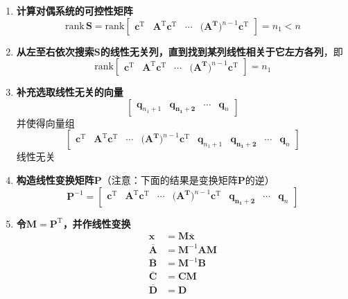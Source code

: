 \example[系统的可观性分解]
\vspace*{-1em}
\begin{enumerate}[\textbf{步骤} 1 ]
	\item \textbf{计算对偶系统的可控性矩阵}
	\begin{equation}
		\text{rank}\, \bm{S} = \text{rank}
		\begin{bmatrix}
			\bm{c}^{\text{T}} & \bm{A}^{\text{T}}\bm{c}^{\text{T}} & \cdots & \big(\bm{A^{\text{T}}}\big)^{n-1}\bm{c}^{\text{T}}
		\end{bmatrix}  = n_1 < n
	\end{equation}
	\item \textbf{从左至右依次搜索$\bm{S}$的线性无关列，直到找到某列线性相关于它左方各列}，即
	\begin{equation}
		\text{rank} 
		\begin{bmatrix}
			\bm{c}^{\text{T}} & \bm{A}^{\text{T}}\bm{c}^{\text{T}} & \cdots & \big(\bm{A^{\text{T}}}\big)^{n-1}\bm{c}^{\text{T}}
		\end{bmatrix}
		= n_1
	\end{equation}
	
	\item \textbf{补充选取线性无关的向量}
	\begin{equation}
		\begin{bmatrix}
			\bm{q}_{n_1+1} & \bm{q_{n_1+2}} & \cdots & \bm{q}_n
		\end{bmatrix}
	\end{equation}
	并使得向量组
	\begin{equation}
		\begin{bmatrix}
			\bm{c}^{\text{T}} & \bm{A}^{\text{T}}\bm{c}^{\text{T}} & \cdots & \big(\bm{A^{\text{T}}}\big)^{n-1}\bm{c}^{\text{T}} & \bm{q}_{n_1+1} & \bm{q_{n_1+2}} & \cdots & \bm{q}_n
		\end{bmatrix}
	\end{equation}
	线性无关
	\item \textbf{构造线性变换矩阵$\bm{P}$}（注意：下面的结果是变换矩阵$\bm{P}$的逆）
	\begin{equation}
		\bm{P}^{-1} = 
		\begin{bmatrix}
		\bm{c}^{\text{T}} & \bm{A}^{\text{T}}\bm{c}^{\text{T}} & \cdots & \big(\bm{A^{\text{T}}}\big)^{n-1}\bm{c}^{\text{T}} & \bm{q_{n_1+2}} & \cdots & \bm{q}_n
		\end{bmatrix}
	\end{equation}
	\item \textbf{令$\bm{M} = \bm{P}^{\text{T}}$，并作线性变换}
	\begin{align}
		\bm{x} &= \bm{M}\overline{\bm{x}}\\
		\overline{\bm{A}} & = \bm{M}^{-1}\bm{AM}\\
		\overline{\bm{B}} & = \bm{M}^{-1}\bm{B}\\
		\overline{\bm{C}} & = \bm{C}\bm{M}\\
		\overline{\bm{D}} & = \bm{D}
	\end{align}
\end{enumerate}


